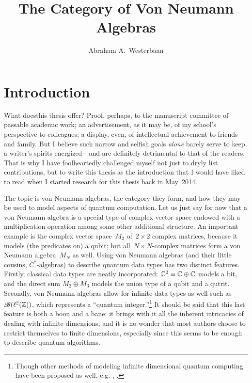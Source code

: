 \documentclass[b5paper]{book}
\begin{document}
\title{%
\sffamily\color{darkblue}%
The Category of Von Neumann Algebras}
\author{Abraham A.~Westerbaan}
\maketitle

\makeatletter{}\makeatother

\chapter{Introduction}

\begin{parsec}
\begin{point}
What doesthis thesis offer?
Proof, perhaps,
to the manuscript committee
of passable academic work;
an advertisement, as it may be,
of my school's perspective
to colleagues;
a display, even,
of intellectual achievement
to friends and family.
But I believe such narrow and selfish goals \emph{alone}
barely serve to keep a writer's spirits 
energized---and are definitely detrimental to that of the readers.
That is why I have foolheartedly
challenged
myself
not just 
to dryly list contributions,
but to write this thesis 
as the introduction
that I would have liked to read
when I started
research for this thesis
back in May~2014.

The topic is von Neumann algebras,
the category they form,
and how they may be used
to model aspects of quantum computation.
Let us just say for now that a von Neumann algebra
is a special type of complex vector
space endowed with
a multiplication operation among some other additional structure.
An important example is the complex vector space~$M_2$
of~$2\times 2$ complex matrices,
because it models (the predicates on) a qubit;
but all~$N\times N$-complex matrices form a von Neumann algebra~$M_N$ as well.
Using von Neumann algebras
(and their little cousins, $C^*$-algebras) 
to describe quantum data types
has two distinct features.
Firstly, classical data types
are neatly incorporated:
$\mathbb{C}^2 \equiv \mathbb{C}\oplus \mathbb{C}$
models a bit,
and the direct sum $M_2\oplus M_3$
models the union type of a qubit and a qutrit.
Secondly,
von Neumann algebras
allow for infinite data types as well
	such as~$\mathscr{B}(\ell^2(\mathbb{Z}))$,
which represents a ``quantum integer.''\footnote{Though
	other methods of modeling infinite dimensional
	quantum computing have been proposed as well, e.g. 
	, .}
It should be said that this last feature
is both a boon and a bane:
it brings with it all the inherent
intricacies of dealing with infinite dimensions;
and it is no wonder that
most authors choose 
to restrict themselves
to finite dimensions,
especially since
this seems to be enough to describe quantum algorithms.


\end{point}
\end{parsec}
\end{document}
